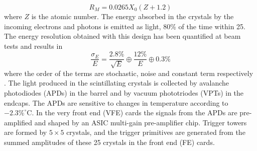 \begin{equation}
R_{M} = 0.0265 X_{0}(Z+1.2)
\end{equation}
where $Z$ is the atomic number.
The energy absorbed in the crystals by the incoming electrons and photons is emitted as light, 80\% of the time within 25\ns. 
The energy resolution obtained with this design has been quantified at beam tests and results in 
\begin{equation}
\frac{\sigma_{E}}{E}=\frac{2.8\%}{\sqrt{E}}\oplus\frac{12\%}{E}\oplus0.3\%
\end{equation}
where the order of the terms are stochastic, noise and constant term respectively \cite{Chatrchyan:2013dga}. 
The light produced in the scintillating crystals is collected by avalanche photodiodes (APDs) in the barrel and by vacuum phototriodes (VPTs) in the endcaps. 
The APDs are sensitive to changes in temperature according to $-2.3\%^{\circ}\mathrm{C}$. 
In the very front end (VFE) cards the signals from the APDs are pre-amplified and shaped by an ASIC multi-gain pre-amplifier chip. 
Trigger towers are formed by $5\times5$ crystals, and the trigger primitives are generated from the summed amplitudes of these 25 crystals in the front end (FE) cards. 
